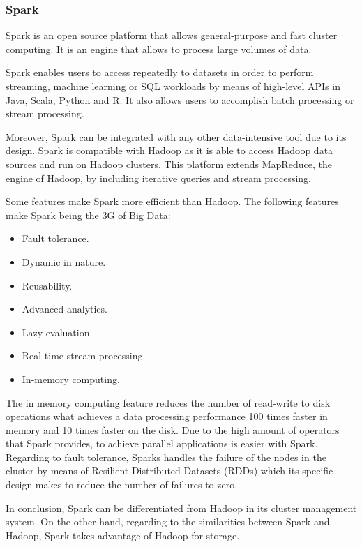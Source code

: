 \subsubsection{Spark}

Spark is an open source platform that allows general-purpose and fast cluster computing. It is an engine that allows to process large volumes of data.

Spark enables users to access repeatedly to datasets in order to perform streaming, machine learning or SQL workloads by means of high-level APIs in Java, Scala, Python and R. It also allows users to accomplish batch processing or stream processing.

Moreover, Spark can be integrated with any other data-intensive tool due to its design. Spark is compatible with Hadoop as it is able to access Hadoop data sources and run on Hadoop clusters. This platform extends MapReduce, the engine of Hadoop, by including iterative queries and stream processing.

Some features make Spark more efficient than Hadoop. The following features make Spark being the 3G of Big Data:

\begin{itemize}

\item Fault tolerance.
\item Dynamic in nature.
\item Reusability.
\item Advanced analytics.
\item Lazy evaluation.
\item Real-time stream processing.
\item In-memory computing.

\end{itemize}

The in memory computing feature reduces the number of read-write to disk operations what achieves a data processing performance 100 times faster in memory and 10 times faster on the disk. Due to the high amount of operators that Spark provides, to achieve parallel applications is easier with Spark. Regarding to fault tolerance, Sparks handles the failure of the nodes in the cluster by means of Resilient Distributed Datasets (RDDs) which its specific design makes to reduce the number of failures to zero.

In conclusion, Spark can be differentiated from Hadoop in its cluster management system. On the other hand, regarding to the similarities between Spark and Hadoop, Spark takes advantage of Hadoop for storage.

